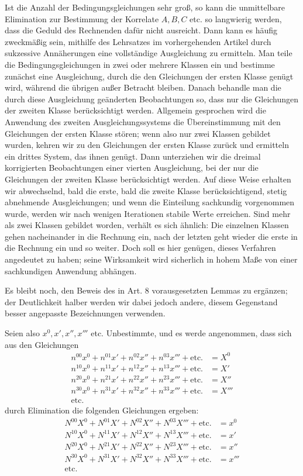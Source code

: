 Ist die Anzahl der Bedingungsgleichungen sehr groß, so kann die unmittelbare Elimination zur Bestimmung der Korrelate \(A,B,C\) etc. so langwierig werden, dass die Geduld des Rechnenden dafür nicht ausreicht. Dann kann es häufig zweckmäßig sein, mithilfe des Lehrsatzes im vorhergehenden Artikel durch sukzessive Annäherungen eine vollständige Ausgleichung zu ermitteln. Man teile die Bedingungsgleichungen in zwei oder mehrere Klassen ein und bestimme zunächst eine Ausgleichung, durch die den Gleichungen der ersten Klasse genügt wird, während die übrigen außer Betracht bleiben. Danach behandle man die durch diese Ausgleichung geänderten Beobachtungen so, dass nur die Gleichungen der zweiten Klasse berücksichtigt werden. Allgemein gesprochen wird die Anwendung des zweiten Ausgleichungssystems die Übereinstimmung mit den Gleichungen der ersten Klasse stören; wenn also nur zwei Klassen gebildet wurden, kehren wir zu den Gleichungen der ersten Klasse zurück und ermitteln ein drittes System, das ihnen genügt. Dann unterziehen wir die dreimal korrigierten Beobachtungen einer vierten Ausgleichung,
bei der nur die Gleichungen der zweiten Klasse berücksichtigt werden. Auf diese Weise erhalten wir abwechselnd, bald die erste, bald die zweite Klasse berücksichtigend, stetig abnehmende Ausgleichungen; und wenn die Einteilung sachkundig vorgenommen wurde, werden wir nach wenigen Iterationen stabile Werte erreichen. Sind mehr als zwei Klassen gebildet worden, verhält es sich ähnlich: Die einzelnen Klassen gehen nacheinander in die Rechnung ein, nach der letzten geht wieder die erste in die Rechnung ein und so weiter. Doch soll es hier genügen, dieses Verfahren angedeutet zu haben; seine Wirksamkeit wird sicherlich in hohem Maße von einer sachkundigen Anwendung abhängen.

Es bleibt noch, den Beweis des in Art. 8 vorausgesetzten Lemmas zu ergänzen; der Deutlichkeit halber werden wir dabei jedoch andere, diesem Gegenstand besser angepasste Bezeichnungen verwenden.

Seien also \(x^0,x',x'',x'''\) etc. Unbestimmte, und es werde angenommen, dass sich aus den Gleichungen
\[
\begin{aligned}
n^{00}x^0+n^{01}x'+n^{02}x''+n^{03}x'''+\text{etc.}&=X^0\\
n^{10}x^0+n^{11}x'+n^{12}x''+n^{13}x'''+\text{etc.}&=X'\\
n^{20}x^0+n^{21}x'+n^{22}x''+n^{23}x'''+\text{etc.}&=X''\\
n^{30}x^0+n^{31}x'+n^{32}x''+n^{33}x'''+\text{etc.}&=X'''\\
\text{etc.}&
\end{aligned}
\]
durch Elimination die folgenden Gleichungen ergeben:
\[
\begin{aligned}
N^{00}X^0+N^{01}X'+N^{02}X''+N^{03}X'''+\text{etc.}&=x^0\\
N^{10}X^0+N^{11}X'+N^{12}X''+N^{13}X'''+\text{etc.}&=x'\\
N^{20}X^0+N^{21}X'+N^{22}X''+N^{23}X'''+\text{etc.}&=x''\\
N^{30}X^0+N^{31}X'+N^{32}X''+N^{33}X'''+\text{etc.}&=x'''\\
\text{etc.}&
\end{aligned}
\]


